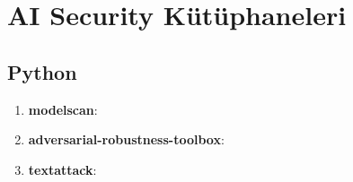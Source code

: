 \section{AI Security Kütüphaneleri}

\subsection{Python}
\begin{enumerate}
    \item \textbf{modelscan}:
    \item \textbf{adversarial-robustness-toolbox}:
    \item \textbf{textattack}:
\end{enumerate}

\newpage